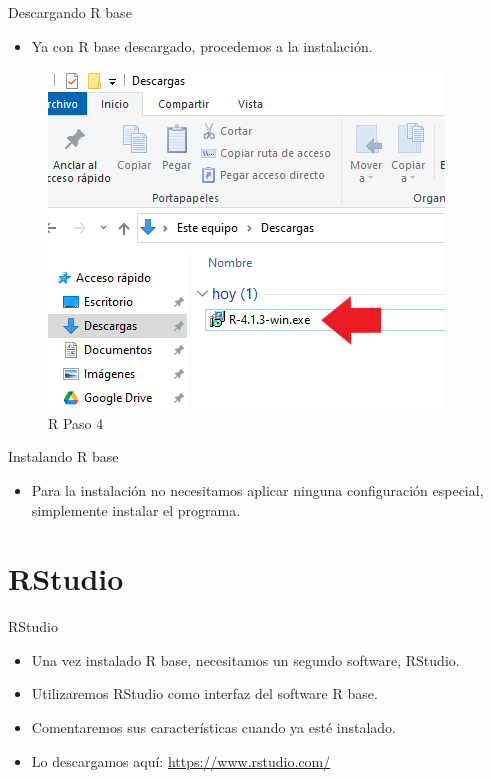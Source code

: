\documentclass[
  13pt,
  ignorenonframetext,
]{beamer}
\providecommand{\tightlist}{%
  \setlength{\itemsep}{0pt}\setlength{\parskip}{0pt}}
\begin{document}
\begin{frame}{Descargando R base}
\label{descargando-r-base-4}
\begin{itemize}
\tightlist
\item
  Ya con R base descargado, procedemos a la instalación.
\end{itemize}

\begin{figure}[H]
\centering
\includegraphics[keepaspectratio,width=\textwidth, height=.6\textheight]{input/img/img1_4.png}
\caption{R Paso 4}\label{rpaso4}
\end{figure}
\end{frame}

\begin{frame}{Instalando R base}
\label{instalando-r-base}
\begin{itemize}
\tightlist
\item
  Para la instalación no necesitamos aplicar ninguna configuración
  especial, simplemente instalar el programa.
\end{itemize}
\end{frame}

\section{RStudio}\label{rstudio}

\begin{frame}{RStudio}
\begin{itemize}
\item
  Una vez instalado R base, necesitamos un segundo software, RStudio.
\item
  Utilizaremos RStudio como interfaz del software R base.
\item
  Comentaremos sus características cuando ya esté instalado.
\item
  Lo descargamos aquí: \url{https://www.rstudio.com/}
\end{itemize}
\end{frame}
\end{document}
